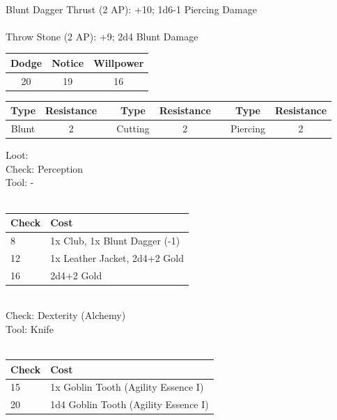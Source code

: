\\
Blunt Dagger Thrust (2 AP): +10; 1d6-1 Piercing Damage\\
\\
Throw Stone (2 AP): +9; 2d4 Blunt Damage\\
\begin{minipage}[H]{1\textwidth}
    \centering
    \begin{tabular}[c]{|c | c | c|}
        \hline
        Dodge & Notice & Willpower\\
        \hline
        20 & 19 & 16\\
        \hline
    \end{tabular}
\end{minipage}
\begin{minipage}[H]{1\textwidth}
    \centering
    \begin{tabular}[c]{|c | c | c | c | c | c | c | c|}
        \hline
        Type & Resistance && Type & Resistance && Type & Resistance\\
        \hline
        Blunt & 2 &&
        Cutting & 2 &&
        Piercing & 2\\
        \hline
    \end{tabular}
\end{minipage}
Loot:\\
Check: Perception\\
Tool: -\\
\\
\begin{minipage}{0.8\textwidth}
    \begin{tabular}{|l | l|}
        \hline
        Check & Cost\\
        \hline
        8 & 1x Club, 1x Blunt Dagger (-1)\\
        12 & 1x Leather Jacket, 2d4+2 Gold\\
        16 & 2d4+2 Gold\\
        \hline
    \end{tabular}
\end{minipage}
\\
Check: Dexterity (Alchemy)\\
Tool: Knife\\
\\
\begin{minipage}{0.8\textwidth}
    \begin{tabular}{|l | l|}
        \hline
        Check & Cost\\
        \hline
        15 & 1x Goblin Tooth (Agility Essence I)\\
        20 & 1d4 Goblin Tooth (Agility Essence I)\\
        \hline
    \end{tabular}
\end{minipage}
\pagebreak